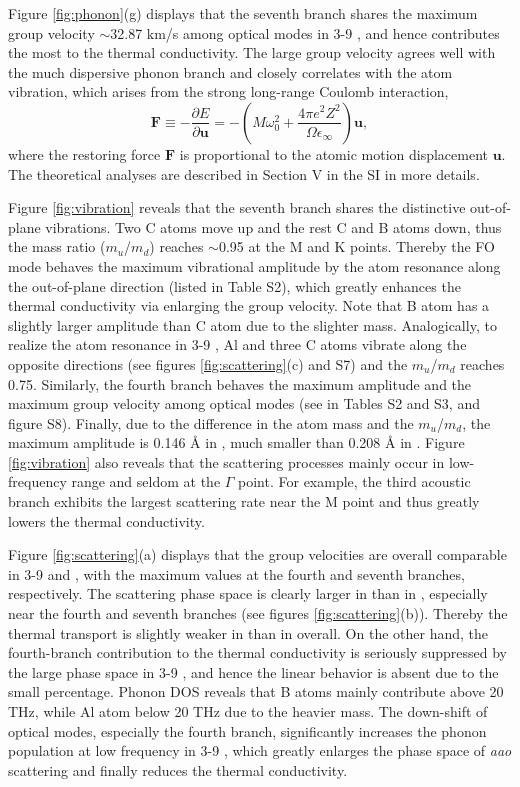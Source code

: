 \documentclass[journal=jpclcd,manuscript=article, layout=twocolumn]{achemso}
\begin{document}
    Figure \ref{fig:phonon}(g) displays that the seventh branch shares the maximum group velocity $\sim$32.87 km/s among optical modes in 3-9 , and hence contributes the most to the thermal conductivity. The large group velocity agrees well with the much dispersive phonon branch and closely correlates with the atom vibration, which arises from the strong long-range Coulomb interaction, \cite{2001-RMP-phonon}
    \begin{equation}
    	\bm{F} \equiv -\frac{\partial E}{\partial \bm{u}}=-\left(M\omega_0^2 + \frac{4\pi e^2Z^2}{\Omega\epsilon_{\infty}}\right)\bm{u},
    \end{equation}
    where the restoring force $\bm{F}$ is proportional to the atomic motion displacement $\bm{u}$. The theoretical analyses are described in Section V in the SI in more details.
    
    Figure \ref{fig:vibration} reveals that the seventh branch shares the distinctive out-of-plane vibrations. Two C atoms move up and the rest C and B atoms down, thus the mass ratio ($m_u$/$m_d$) reaches $\sim$0.95 at the M and K points. Thereby the FO mode behaves the maximum vibrational amplitude by the atom resonance along the out-of-plane direction (listed in Table S2), which greatly enhances the thermal conductivity via enlarging the group velocity. Note that B atom has a slightly larger amplitude than C atom due to the slighter mass. Analogically, to realize the atom resonance in 3-9 , Al and three C atoms vibrate along the opposite directions (see figures \ref{fig:scattering}(c) and S7) and the $m_u$/$m_d$ reaches 0.75. Similarly, the fourth branch behaves the maximum amplitude and the maximum group velocity among optical modes (see in Tables S2 and S3, and figure S8). Finally, due to the difference in the atom mass and the $m_u$/$m_d$, the maximum amplitude is 0.146 {\AA} in , much smaller than 0.208 {\AA} in .
    Figure \ref{fig:vibration} also reveals that the scattering processes mainly occur in low-frequency range and seldom at the $\Gamma$ point. For example, the third acoustic branch exhibits the largest scattering rate near the M point and thus greatly lowers the thermal conductivity.
    
    Figure \ref{fig:scattering}(a) displays that the group velocities are overall comparable in 3-9  and , with the maximum values at the fourth and seventh branches, respectively. The scattering phase space is clearly larger in  than in , especially near the fourth and seventh branches (see figures \ref{fig:scattering}(b)). Thereby the thermal transport is slightly weaker in  than in  overall. On the other hand, the fourth-branch contribution to the thermal conductivity is seriously suppressed by the large phase space in 3-9 , and hence the linear behavior is absent due to the small percentage. Phonon DOS reveals that B atoms mainly contribute above 20 THz, while Al atom below 20 THz due to the heavier mass. The down-shift of optical modes, especially the fourth branch, significantly increases the phonon population at low frequency in 3-9 , which greatly enlarges the phase space of \textit{aao} scattering and finally reduces the thermal conductivity. 
    
\end{document}
